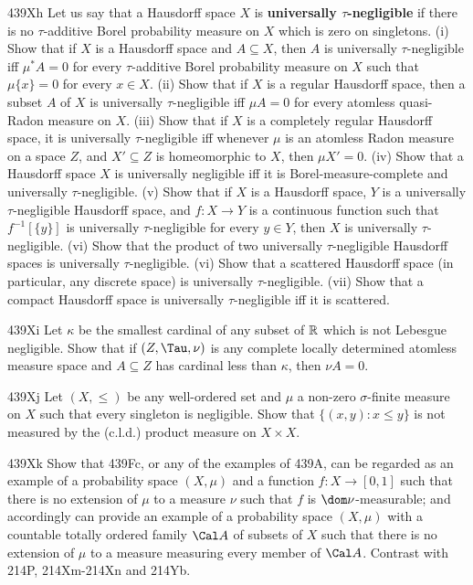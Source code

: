 {\spheader 439Xh Let us say that a Hausdorff space $X$ is {\bf
universally $\tau$-negligible} if there is no $\tau$-additive Borel
probability measure on $X$ which is zero on singletons.   (i) Show that
if $X$ is a Hausdorff space and $A\subseteq X$, then $A$ is universally
$\tau$-negligible iff $\mu^*A=0$ for every $\tau$-additive Borel
probability measure on $X$ such that $\mu\{x\}=0$ for every $x\in X$.
(ii) Show that if $X$ is a regular Hausdorff space, then a subset $A$ of
$X$ is universally $\tau$-negligible iff $\mu A=0$ for every atomless
quasi-Radon measure on $X$.   (iii) Show that if $X$ is a completely
regular Hausdorff space, it is universally $\tau$-negligible iff
whenever $\mu$ is an atomless Radon measure on a space $Z$, and
$X'\subseteq Z$ is homeomorphic to $X$, then $\mu X'=0$.   (iv) Show
that a Hausdorff space $X$ is universally negligible iff it is
Borel-measure-complete and universally $\tau$-negligible.   (v) Show
that if $X$ is a Hausdorff space, $Y$ is a universally $\tau$-negligible
Hausdorff space, and $f:X\to Y$ is a continuous function such that
$f^{-1}[\{y\}]$ is universally $\tau$-negligible for every $y\in Y$,
then $X$ is universally $\tau$-negligible.   (vi) Show that the product
of two universally $\tau$-negligible Hausdorff spaces is universally
$\tau$-negligible.   (vi) Show that a scattered Hausdorff space (in
particular, any discrete space) is universally $\tau$-negligible.
(vii) Show that a compact
Hausdorff space is universally $\tau$-negligible iff it is scattered.

\sqheader 439Xi Let $\kappa$ be the smallest cardinal of any subset of
$\Bbb R$ which is not Lebesgue negligible.   Show that if $(Z,\Tau,\nu)$
is any complete locally determined atomless measure space and
$A\subseteq Z$ has cardinal less than $\kappa$, then $\nu A=0$.

\spheader 439Xj Let $(X,\le)$ be any well-ordered set and $\mu$ a
non-zero $\sigma$-finite measure on $X$ such that every
singleton is negligible.   Show that $\{(x,y):x\le y\}$ is not
measured by the (c.l.d.) product measure on $X\times X$.

\sqheader 439Xk Show that 439Fc, or any of the examples of 439A, can be
regarded as an example of a probability space $(X,\mu)$ and
a function $f:X\to[0,1]$ such that there is no extension of $\mu$ to a
measure $\nu$ such that $f$ is $\dom\nu$-measurable;  and accordingly can
provide an example of a probability space $(X,\mu)$ with a countable
totally ordered family $\Cal A$ of subsets of $X$ such that there is no
extension of $\mu$ to a measure measuring every member of $\Cal A$.
Contrast with 214P, 214Xm-214Xn and 214Yb.

}
